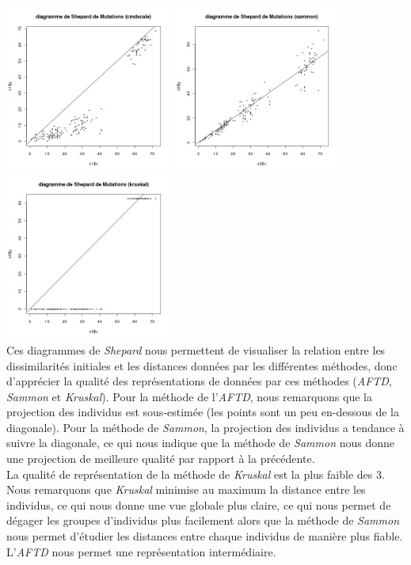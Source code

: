 \documentclass[a4paper, 10pt]{article}
\begin{document}
\includegraphics[height = 5.5cm, width = 5.5cm]{plots/plot_mutations_shepard_cmdscale.png}
\includegraphics[height = 5.5cm, width = 5.5cm]{plots/plot_mutations_shepard_sammon.png}
\includegraphics[height = 5.5cm, width = 5.5cm]{plots/plot_mutations_shepard_kruskal.png}\\
Ces diagrammes de \textit{Shepard} nous permettent de visualiser la relation entre les dissimilarités initiales et les distances données par les différentes méthodes, donc d'apprécier la qualité des représentations de données par ces méthodes
(\textit{AFTD}, \textit{Sammon} et \textit{Kruskal}).
Pour la méthode de l'\textit{AFTD}, nous remarquons que la projection des individus est sous-estimée (les points sont un peu en-dessous de la diagonale).
Pour la méthode de \textit{Sammon}, la projection des individus a tendance à suivre la diagonale, ce qui nous indique que la méthode de
\textit{Sammon} nous donne une projection de meilleure qualité par rapport à la précédente.\\
La qualité de représentation de la méthode de \textit{Kruskal} est la plus faible des 3.
Nous remarquons que \textit{Kruskal} minimise au maximum la distance entre les individus, ce qui nous donne une vue globale plus claire,
ce qui nous permet de dégager les groupes d'individus plus facilement alors que la méthode de \textit{Sammon} nous permet d'étudier
les distances entre chaque individus de manière plus fiable.
L'\textit{AFTD} nous permet une représentation intermédiaire.
\end{document}
